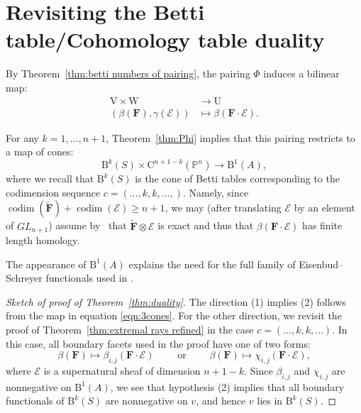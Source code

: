 \documentclass[12pt]{amsart}
\theoremstyle{definition}
\theoremstyle{remark}
\newcommand{\codim}{\operatorname{codim}}
\newcommand{\PP}{\mathbb{P}}
\newcommand{\UU}{\mathrm{U}}
\newcommand{\VV}{\mathrm{V}}
\newcommand{\WW}{\mathrm{W}}
\newcommand{\cc}{c}
\newcommand{\cE}{\mathcal{E}}
\newcommand{\FF}{\mathbf{F}}
\newcommand{\GL}{{GL}}
\newcommand{\CQ}{\mathrm{C}}
\newcommand{\BBQ}{\mathrm{B}}
\begin{document}
\section{Revisiting the Betti table/Cohomology table duality}\label{sec:duality}


By Theorem~\ref{thm:betti numbers of pairing}, the pairing $\Phi$ induces a bilinear map:
\begin{align*}
\VV\times \WW & \to \UU\\
(\beta(\FF),\gamma(\cE))&\mapsto \beta(\FF\cdot \cE).
\end{align*}


For any $k=1, \dots, n+1$, Theorem~\ref{thm:Phi}  implies that this pairing  restricts to a map of cones:
\begin{equation}\label{eqn:3cones}
\BBQ^{k}(S)\times \CQ^{n+1-k}(\PP^n)\to \BBQ^1(A),
\end{equation}
where we recall that $\BBQ^k(S)$ is the cone of Betti tables corresponding to the codimension sequence $\cc=(\dots,k,k,\dots,)$.
Namely, since $\codim(\widetilde{\FF})+\codim(\cE)\geq n+1$, we may (after translating $\cE$ by an element of $\GL_{n+1}$) assume by~\cite[Theorem, p. 335]{miller-speyer} that $\widetilde{\FF}\otimes \cE$ is exact and thus that $\beta(\FF\cdot \cE)$ has finite length homology.

The 
 appearance of $\BBQ^1(A)$ explains the need for the full family of Eisenbud--Schreyer functionals used in \cite{eis-schrey1}.
\begin{proof}[Sketch of proof of Theorem~\ref{thm:duality}]
The direction (1) implies (2) follows from the map in equation \eqref{eqn:3cones}. For the other direction, we revisit the proof of Theorem~\ref{thm:extremal rays refined} in the case $\cc=(\dots, k,k,\dots)$.  In this case, all boundary facets used in the proof have one of two forms:
\[
\beta(\FF)\mapsto\beta_{i,j}(\FF\cdot \cE) \qquad \text{ or } \qquad \beta(\FF)\mapsto\chi_{i,j}(\FF\cdot \cE),
\]
where $\cE$ is a supernatural sheaf of dimension $n+1-k$.  Since $\beta_{i,j}$ and $\chi_{i,j}$ are nonnegative on $\BBQ^1(A)$, we see that hypothesis (2) implies that all boundary functionals of $\BBQ^k(S)$ are nonnegative on $v$, and hence $v$ lies in $\BBQ^k(S)$.
\end{proof}
%
\end{document}
